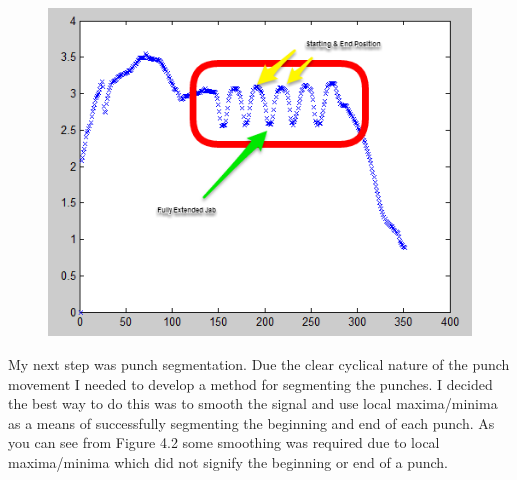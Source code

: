 \begin{figure}[h]
    \centering
    \includegraphics[height=0.25\textheight]{fig04/fig01}
    \label{fig:kinect}
\end{figure}







My next step was punch segmentation. Due the clear cyclical nature of the punch movement I needed to develop a method for segmenting the punches. I decided the best way to do this was to smooth the signal and use local maxima/minima as a means of successfully segmenting the beginning and end of each punch. As you can see from Figure 4.2 some smoothing was required due to local maxima/minima which did not signify the beginning or end of a punch.



